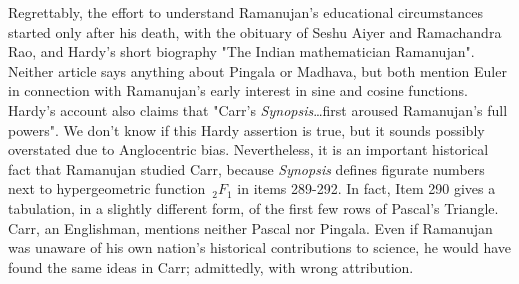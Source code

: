 \documentclass[nofootinbib,preprint]{revtex4-1}
\begin{document}
Regrettably, the effort to understand Ramanujan's educational circumstances started only after his death, 
with the obituary of Seshu Aiyer and Ramachandra Rao, and Hardy's short biography 
"The Indian mathematician Ramanujan"\cite{AIYARRAO1927,HARDY1937}. Neither article says anything about 
Pingala or Madhava, but both mention Euler in connection with Ramanujan's early interest in sine and 
cosine functions. Hardy's account also claims that "Carr's \textit{Synopsis}\ldots first aroused Ramanujan's 
full powers". We don't know if this Hardy assertion is true, but it sounds possibly overstated due 
to Anglocentric bias. Nevertheless, it is an important historical fact that Ramanujan studied Carr, 
because \textit{Synopsis} defines figurate numbers next to hypergeometric function $\,_2F_1$ in 
items 289-292. In fact, Item 290 gives a tabulation, in a slightly different form, of the first few 
rows of Pascal's Triangle. Carr, an Englishman, mentions neither Pascal nor Pingala. Even if Ramanujan 
was unaware of his own nation's historical contributions to science, he would have found the same ideas 
in Carr; admittedly, with wrong attribution. 
\end{document}
